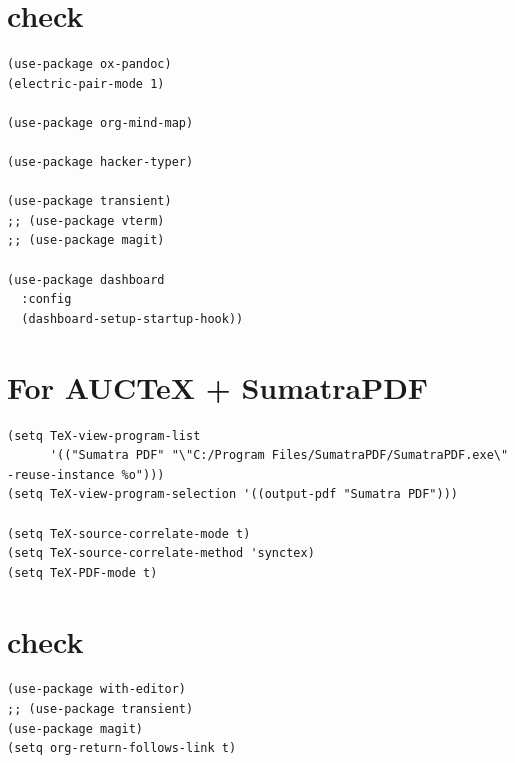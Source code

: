 \documentclass[11pt]{article}
\begin{document}
\section{check}
\label{sec:orge9a59f7}
\begin{verbatim}
(use-package ox-pandoc)
(electric-pair-mode 1)

(use-package org-mind-map)

(use-package hacker-typer)

(use-package transient)
;; (use-package vterm)
;; (use-package magit)

(use-package dashboard
  :config
  (dashboard-setup-startup-hook))
\end{verbatim}
\section{For AUCTeX + SumatraPDF}
\label{sec:orged66193}
\begin{verbatim}
(setq TeX-view-program-list
      '(("Sumatra PDF" "\"C:/Program Files/SumatraPDF/SumatraPDF.exe\" -reuse-instance %o")))
(setq TeX-view-program-selection '((output-pdf "Sumatra PDF")))

(setq TeX-source-correlate-mode t)
(setq TeX-source-correlate-method 'synctex)
(setq TeX-PDF-mode t)
\end{verbatim}
\section{check}
\label{sec:orgeb9c094}
\begin{verbatim}
(use-package with-editor)
;; (use-package transient)
(use-package magit)
(setq org-return-follows-link t)
\end{verbatim}
\end{document}
